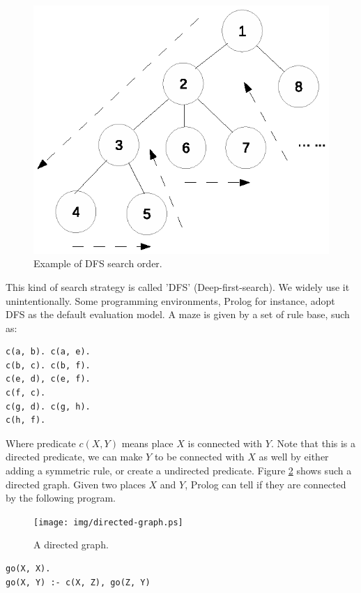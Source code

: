 \documentclass[UTF8]{article}
\begin{document}
\begin{figure}[htbp]
 \centering
 \includegraphics[scale=0.5]{img/dfs-tree.eps}
 \caption{Example of DFS search order.}
 \label{fig:dfs-tree}
\end{figure}

This kind of search strategy is called 'DFS' (Deep-first-search). We widely
use it unintentionally. Some programming environments, Prolog for instance,
adopt DFS as the default evaluation model. A maze is given by a set
of rule base, such as:

\lstset{language=Prolog}
\begin{lstlisting}
c(a, b). c(a, e).
c(b, c). c(b, f).
c(e, d), c(e, f).
c(f, c).
c(g, d). c(g, h).
c(h, f).
\end{lstlisting}

Where predicate $c(X, Y)$ means place $X$ is connected with $Y$. Note that
this is a directed predicate, we can make $Y$ to be connected with $X$ as well
by either adding a symmetric rule, or create a undirected predicate. Figure
\ref{fig:directed-graph} shows such a directed graph. Given two places $X$ and $Y$, Prolog can
tell if they are connected by the following program.

\begin{figure}[htbp]
 \centering
 \texttt{[image: img/directed-graph.ps]}
 \caption{A directed graph.}
 \label{fig:directed-graph}
\end{figure}

\lstset{language=Prolog}
\begin{lstlisting}
go(X, X).
go(X, Y) :- c(X, Z), go(Z, Y)
\end{lstlisting}
\end{document}
